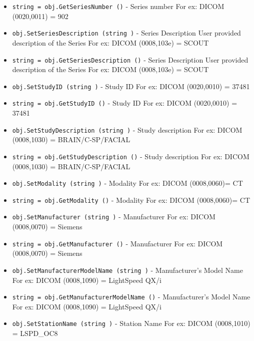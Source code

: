 \begin{itemize}
\item  \verb|string = obj.GetSeriesNumber ()| -  Series number
 For ex: DICOM (0020,0011) = 902

\item  \verb|obj.SetSeriesDescription (string )| -  Series Description
 User provided description of the Series
 For ex: DICOM (0008,103e) = SCOUT

\item  \verb|string = obj.GetSeriesDescription ()| -  Series Description
 User provided description of the Series
 For ex: DICOM (0008,103e) = SCOUT

\item  \verb|obj.SetStudyID (string )| -  Study ID
 For ex: DICOM (0020,0010) = 37481

\item  \verb|string = obj.GetStudyID ()| -  Study ID
 For ex: DICOM (0020,0010) = 37481

\item  \verb|obj.SetStudyDescription (string )| -  Study description
 For ex: DICOM (0008,1030) = BRAIN/C-SP/FACIAL

\item  \verb|string = obj.GetStudyDescription ()| -  Study description
 For ex: DICOM (0008,1030) = BRAIN/C-SP/FACIAL

\item  \verb|obj.SetModality (string )| -  Modality
 For ex: DICOM (0008,0060)= CT

\item  \verb|string = obj.GetModality ()| -  Modality
 For ex: DICOM (0008,0060)= CT

\item  \verb|obj.SetManufacturer (string )| -  Manufacturer
 For ex: DICOM (0008,0070) = Siemens

\item  \verb|string = obj.GetManufacturer ()| -  Manufacturer
 For ex: DICOM (0008,0070) = Siemens

\item  \verb|obj.SetManufacturerModelName (string )| -  Manufacturer's Model Name
 For ex: DICOM (0008,1090) = LightSpeed QX/i

\item  \verb|string = obj.GetManufacturerModelName ()| -  Manufacturer's Model Name
 For ex: DICOM (0008,1090) = LightSpeed QX/i

\item  \verb|obj.SetStationName (string )| -  Station Name
 For ex: DICOM (0008,1010) = LSPD\_OC8


\end{itemize}
